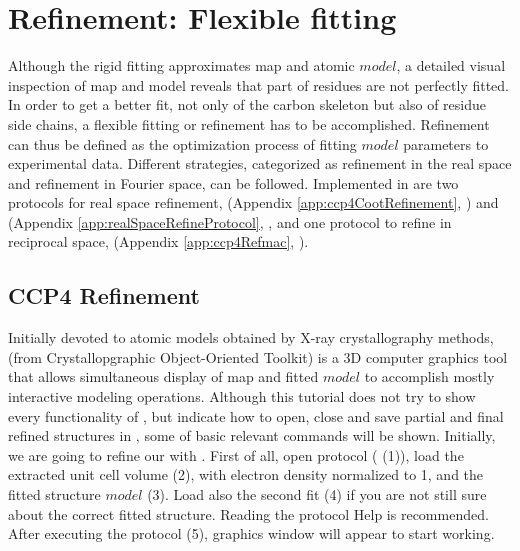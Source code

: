 \section{Refinement: Flexible fitting}
\label{refinementFlexibleFitting}
Although the rigid fitting approximates map and atomic $model$, a detailed visual inspection of map and model reveals that part of residues are not perfectly fitted. In order to get a better fit, not only of the carbon skeleton but also of residue side chains, a flexible fitting or refinement has to be accomplished. Refinement can thus be defined as the optimization process of fitting $model$ parameters to experimental data. Different strategies, categorized as refinement in the real space and refinement in Fourier space, can be followed. Implemented in \scipion are two protocols for real space refinement,  (Appendix \ref{app:ccp4CootRefinement}, \citep{emsley2010}) and  (Appendix \ref{app:realSpaceRefineProtocol}, \citep{afonine2018a}, and one protocol to refine in reciprocal space,  (Appendix \ref{app:ccp4Refmac}, \citep{vagin2004}).

 \subsection*{CCP4 \coot Refinement}
 
 Initially devoted to atomic models obtained by X-ray crystallography methods, \coot (from Crystallopgraphic Object-Oriented Toolkit) is a 3D computer graphics tool that allows simultaneous display of map and fitted $model$ to accomplish mostly interactive modeling operations. Although this tutorial does not try to show every functionality of \coot, but indicate how to open, close and save partial and final \coot refined structures in \scipion, some of \coot basic relevant commands will be shown. Initially, we are going to refine our  with \coot. First of all, open  protocol ( (1)), load the extracted unit cell volume (2), with electron density normalized to 1, and the fitted structure $model$ (3). Load also the second fit (4) if you are not still sure about the correct fitted structure. Reading the protocol Help is recommended. After executing the protocol (5), \coot graphics window will appear to start working. 
 
